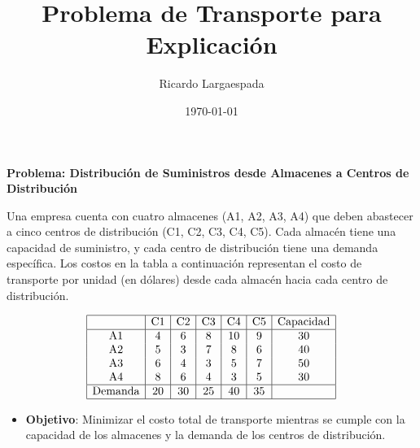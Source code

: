 \documentclass{article}
\title{Problema de Transporte para Explicación}
\author{Ricardo Largaespada}
\date{\today}
\begin{document}
\maketitle

\vspace{-1cm}

\begin{problem}
\textbf{Problema: Distribución de Suministros desde Almacenes a Centros de Distribución}

Una empresa cuenta con cuatro almacenes (A1, A2, A3, A4) que deben abastecer a cinco centros de distribución (C1, C2, C3, C4, C5). Cada almacén tiene una capacidad de suministro, y cada centro de distribución tiene una demanda específica. Los costos en la tabla a continuación representan el costo de transporte por unidad (en dólares) desde cada almacén hacia cada centro de distribución.

\[
\begin{array}{|c|c|c|c|c|c|c|}
\hline
           & \text{C1} & \text{C2} & \text{C3} & \text{C4} & \text{C5} & \text{Capacidad} \\
\hline
\text{A1}  & 4         & 6         & 8         & 10        & 9         & 30        \\
\text{A2}  & 5         & 3         & 7         & 8         & 6         & 40        \\
\text{A3}  & 6         & 4         & 3         & 5         & 7         & 50        \\
\text{A4}  & 8         & 6         & 4         & 3         & 5         & 30        \\
\hline
\text{Demanda} & 20    & 30        & 25        & 40        & 35        &           \\
\hline
\end{array}
\]

\begin{itemize}
    \item \textbf{Objetivo}: Minimizar el costo total de transporte mientras se cumple con la capacidad de los almacenes y la demanda de los centros de distribución.
\end{itemize}

\end{problem}
\end{document}

